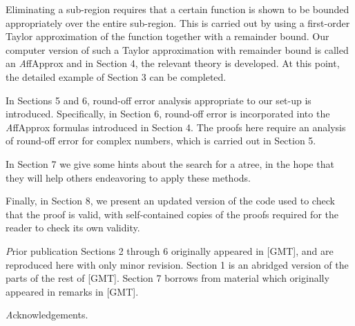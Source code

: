 Eliminating 
a sub-region requires that a certain function is shown to be bounded 
appropriately over the entire sub-region.  This is carried out by using a 
first-order Taylor approximation of the function together with a 
remainder 
bound.
Our computer version of such a Taylor approximation with remainder bound 
is called an {\textit AffApprox} and in Section 4,
the relevant theory is developed.
At this point, the detailed example of Section 3 can be completed.

In Sections 5 and 6, round-off error analysis appropriate to our 
set-up is introduced.  Specifically, in Section 6, round-off error is 
incorporated 
into the {\textit AffApprox} formulas introduced in Section 4.  The proofs here 
require an analysis of round-off error for complex numbers, which is carried 
out in Section 5.

In Section 7 we give some hints about the search for a atree,
in the hope that they will help others endeavoring to apply these methods.

Finally, in Section 8, we present an updated version of
the code used to check that the proof is valid,
with self-contained copies of the proofs required for the reader
to check its own validity.

{\textit Prior publication}
Sections 2 through 6 originally appeared in [GMT],
and are reproduced here with only minor revision.
Section 1 is an abridged version of the parts of the rest of [GMT].
Section 7 borrows from material which originally appeared in remarks in [GMT].

{\textit Acknowledgements}.
